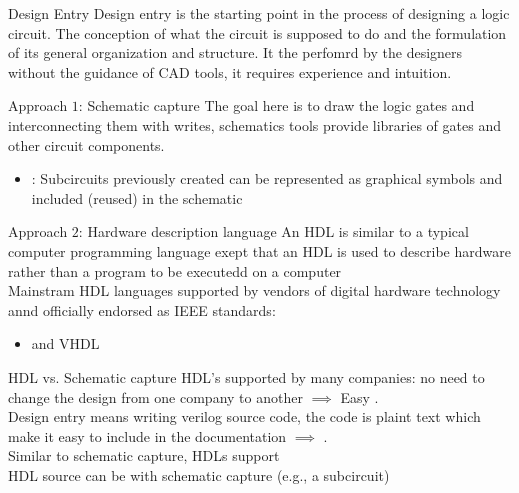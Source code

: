   \begin{parag}{Design Entry}
       Design entry is the starting point in the process of designing a logic circuit. The conception of what the circuit is supposed to do and the formulation of its general organization and structure. It the perfomrd by the designers without the guidance of CAD tools, it requires experience and intuition.
       \begin{subparag}{Approach $1$: Schematic capture}
           The goal here is to draw the logic gates and interconnecting them with writes, schematics tools provide libraries of gates and other circuit components.
           \begin{itemize}
               \item {}: Subcircuits previously created can be represented as graphical symbols and included (reused) in the schematic
           \end{itemize}
           
       \end{subparag}
       \begin{subparag}{Approach $2$: Hardware description language}
           An HDL is similar to a typical computer programming language exept that an HDL is used to describe hardware rather than a program to be executedd on a computer\\
           Mainstram HDL languages supported by vendors of digital hardware technology annd officially endorsed as IEEE standards:
           \begin{itemize}
               \item {} and VHDL
           \end{itemize}

       \end{subparag}
       
   \begin{subparag}{HDL vs. Schematic capture}
       HDL's supported by many companies: no need to change the design from one company to another $ \implies$ Easy .\\ 
       Design entry means writing verilog source code, the code is plaint text which make it easy to include in the documentation $ \implies$ .\\
       Similar to schematic capture, HDLs support \\
       HDL source can be  with schematic capture (e.g., a subcircuit)
   \end{subparag}
   \end{parag}
